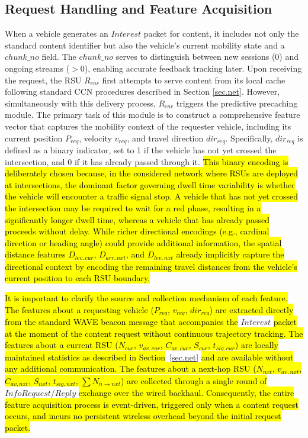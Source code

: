 \documentclass[journal]{IEEEtran}
\begin{document}
\subsection{Request Handling and Feature Acquisition}\label{subsec:1}
When a vehicle generates an \(Interest\) packet for content, it includes not only the standard content identifier but also the vehicle's current mobility state and a \(chunk\_no\) field.
The \(chunk\_no\) serves to distinguish between new sessions (0) and ongoing streams ($>0$), enabling accurate feedback tracking later.
Upon receiving the request, the RSU $R_{cur}$ first attempts to serve content from its local cache following standard CCN procedures described in Section \ref{sec.net}. 
However, simultaneously with this delivery process, $R_{cur}$ triggers the predictive precaching module.
The primary task of this module is to construct a comprehensive feature vector that captures the mobility context of the requester vehicle, including its current position $P_{req}$, velocity $v_{req}$, and travel direction $dir_{req}$.
Specifically, $dir_{req}$ is defined as a binary indicator, set to 1 if the vehicle has not yet crossed the intersection, and 0 if it has already passed through it.
\hl{This binary encoding is deliberately chosen because, in the considered network where RSUs are deployed at intersections, the dominant factor governing dwell time variability is whether the vehicle will encounter a traffic signal stop.
A vehicle that has not yet crossed the intersection may be required to wait for a red phase, resulting in a significantly longer dwell time, whereas a vehicle that has already passed proceeds without delay.
While richer directional encodings (e.g., cardinal direction or heading angle) could provide additional information, the spatial distance features $D_{lev,cur}$, $D_{arr,nxt}$, and $D_{lev,nxt}$ already implicitly capture the directional context by encoding the remaining travel distances from the vehicle's current position to each RSU boundary.}

\hl{It is important to clarify the source and collection mechanism of each feature.
The features about a requesting vehicle ($P_{req}$, $v_{req}$, $dir_{req}$) are extracted directly from the standard WAVE beacon message that accompanies the} \(Interest\) \hl{packet at the moment of the content request without continuous trajectory tracking.
The features about a current RSU ($N_{cur}$, $v_{av,cur}$, $C_{av,cur}$, $S_{cur}$, $t_{sig,cur}$) are locally maintained statistics as described in Section}~\ref{sec.net} \hl{and are available without any additional communication.
The features about a next-hop RSU ($N_{nxt}$, $v_{av,nxt}$, $C_{av,nxt}$, $S_{nxt}$, $t_{sig,nxt}$, $\sum N_{n\rightarrow nxt}$) are collected through a single round of} \(Info Request/Reply\) \hl{exchange over the wired backhaul.
Consequently, the entire feature acquisition process is event-driven, triggered only when a content request occurs, and incurs no persistent wireless overhead beyond the initial request packet.}
\end{document}
